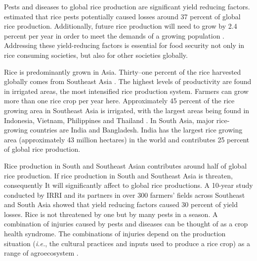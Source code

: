 ﻿%

Pests and diseases to global rice production are significant yield reducing factors.  estimated that rice pests potentially caused losses around 37 percent of global rice production. Additionally, future rice production will need to grow by 2.4 percent per year in order to meet the demands of a growing population . Addressing these yield-reducing factors is essential for food security not only in rice consuming societies, but also for other societies globally.

Rice is predominantly grown in Asia. Thirty--one percent of the rice harvested globally comes from Southeast Asia . The highest levels of productivity are found in irrigated areas, the most intensified rice production system. Farmers can grow more than one rice crop per year here. Approximately 45 percent of the rice growing area in Southeast Asia is irrigated, with the largest areas being found in Indonesia, Vietnam, Philippines and Thailand . In South Asia, major rice-growing countries are India and Bangladesh. India has the largest rice growing area (approximately 43 million hectares) in the world and contributes 25 percent of global rice production. 


Rice production in South and Southeast Asian contributes around half of global rice production. If rice production in South and Southeast Asia is threaten, consequently It will significantly affect to global rice productions. A 10-year study conducted by IRRI and its partners  in over 300 farmers’ fields across Southeast and South Asia showed that yield reducing factors caused 30 percent of yield losses. Rice is not threatened by one but by many pests in a season. A combination of injuries caused by pests and diseases can be thought of as a crop health syndrome. The combinations of injuries depend on the production situation (\textit{i.e.}, the cultural practices and inputs used to produce a rice crop) as a range of agroecosystem .

